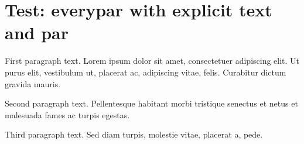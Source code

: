 \documentclass[11pt,a4paper]{article}
\begin{document}
\section{Test: everypar with explicit text and par}

\noindent
{}
%
First paragraph text. Lorem ipsum dolor sit amet, consectetuer adipiscing elit. Ut purus elit, vestibulum ut, placerat ac, adipiscing vitae, felis. Curabitur dictum gravida mauris.

Second paragraph text. Pellentesque habitant morbi tristique senectus et netus et malesuada fames ac turpis egestas.

Third paragraph text. Sed diam turpis, molestie vitae, placerat a, pede.

\everypar{}%
\end{document}

